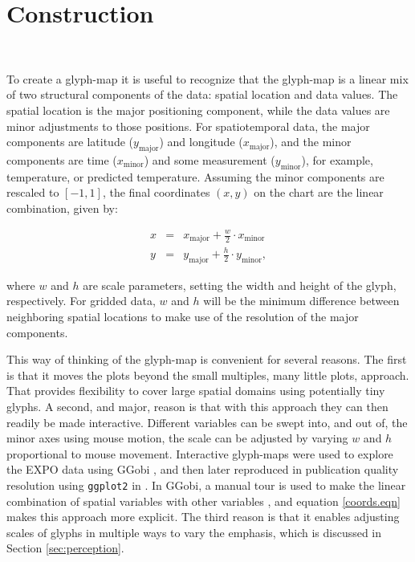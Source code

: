 \documentclass[oneside]{article}
\newcommand\amin{\text{minor}}
\newcommand\amaj{\text{major}}
\begin{document}
\section{Construction}~\label{sec:construction}

To create a glyph-map it is useful to recognize that the glyph-map is a linear mix of two structural components of the data: spatial location and data values. The spatial location is the major positioning component, while the data values are minor adjustments to those positions. For spatiotemporal data, the major components are latitude ($y_{\amaj}$) and longitude ($x_{\amaj}$), and the minor components are time ($x_{\amin}$) and some measurement ($y_{\amin}$), for example, temperature, or predicted temperature. Assuming the minor components are rescaled to $[-1, 1]$, the final coordinates $(x,y)$ on the chart are the linear combination, given by:

\begin{equation}
  \begin{array}{lll}
  x &=& x_{\amaj} + \frac{w}{2} \cdot x_{\amin}\\
  y &=& y_{\amaj} + \frac{h}{2} \cdot y_{\amin}, 
  \end{array}
  \label{coords.eqn}
\end{equation}

\noindent where $w$ and $h$ are scale parameters, setting the width and height of the glyph, respectively. For gridded data, $w$ and $h$ will be the minimum difference between neighboring spatial locations to make use of the resolution of the major components. 

This way of thinking of the glyph-map is convenient for several reasons. The first is that it moves the plots beyond the small multiples, many little plots, approach. That provides flexibility to cover large spatial domains using potentially tiny glyphs. A second, and major, reason is that with this approach they can then readily be made interactive. Different variables can be swept into, and out of, the minor axes using mouse motion, the scale can be adjusted by varying $w$ and $h$ proportional to mouse movement. Interactive glyph-maps were used to explore the EXPO data using  GGobi \citep{swayne:2003}, and then later reproduced in publication quality resolution using {\tt ggplot2} \citep{me:ggplot2} in \citet{hobbs:2010}. In GGobi, a manual tour is used to make the linear combination of spatial variables with other variables \citep{CB95}, and equation \ref{coords.eqn} makes this approach more explicit. The third reason is that it enables adjusting scales of glyphs in multiple ways to vary the emphasis, which is discussed in Section \ref{sec:perception}.
\end{document}
